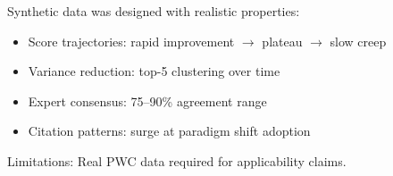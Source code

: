 
Synthetic data was designed with realistic properties:
\begin{itemize}
\item Score trajectories: rapid improvement $\rightarrow$ plateau $\rightarrow$ slow creep
\item Variance reduction: top-5 clustering over time
\item Expert consensus: 75--90\% agreement range
\item Citation patterns: surge at paradigm shift adoption
\end{itemize}

Limitations: Real PWC data required for applicability claims.

